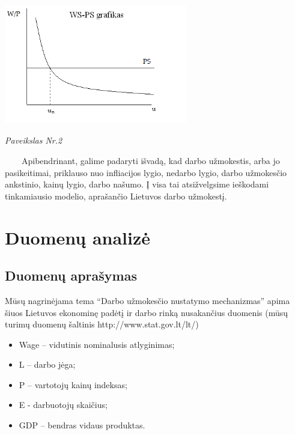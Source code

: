 \documentclass[12pt,a4paper]{article}
\theoremstyle{change}\newtheorem{salyga}{Uždavinys}
\begin{document}
\begin{center}
\includegraphics[width=80mm,height=60mm]{wsps.PNG}
\\
\textit{Paveikslas Nr.2}
\end{center}

\vskip 8pt
$\qquad $Apibendrinant, galime padaryti išvadą, kad darbo užmokestis, arba jo pasikeitimai, priklauso nuo infliacijos lygio, nedarbo lygio, darbo užmokesčio ankstinio, kainų lygio, darbo našumo. Į visa tai atsižvelgsime ieškodami tinkamiausio modelio, aprašančio Lietuvos darbo užmokestį.

\pagebreak









\section{Duomenų analizė}
\bigskip





\subsection{Duomenų aprašymas}
\medskip
\hspace{40pt}Mūsų nagrinėjama tema “Darbo užmokesčio nustatymo mechanizmas” apima šiuos Lietuvos ekonominę padėtį ir darbo rinką nusakančius duomenis (mūsų turimų duomenų šaltinis http://www.stat.gov.lt/lt/)

\medskip

\begin{itemize}
\item Wage – vidutinis nominalusis atlyginimas;
\item L – darbo jėga;
\item P – vartotojų kainų indeksas;
\item E -  darbuotojų skaičius;
\item GDP – bendras vidaus produktas.
\end{itemize}
\end{document}
